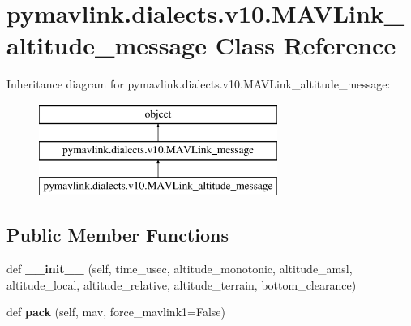 \hypertarget{classpymavlink_1_1dialects_1_1v10_1_1MAVLink__altitude__message}{}\section{pymavlink.\+dialects.\+v10.\+M\+A\+V\+Link\+\_\+altitude\+\_\+message Class Reference}
\label{classpymavlink_1_1dialects_1_1v10_1_1MAVLink__altitude__message}
Inheritance diagram for pymavlink.\+dialects.\+v10.\+M\+A\+V\+Link\+\_\+altitude\+\_\+message\+:\begin{figure}[H]
\begin{center}
\leavevmode
\includegraphics[height=3.000000cm]{classpymavlink_1_1dialects_1_1v10_1_1MAVLink__altitude__message}
\end{center}
\end{figure}
\subsection*{Public Member Functions}
\begin{DoxyCompactItemize}
\item 
\mbox{\label{classpymavlink_1_1dialects_1_1v10_1_1MAVLink__altitude__message_ad6216ccac072b9a6d583aad348bc483d}} 
def {\bfseries \+\_\+\+\_\+init\+\_\+\+\_\+} (self, time\+\_\+usec, altitude\+\_\+monotonic, altitude\+\_\+amsl, altitude\+\_\+local, altitude\+\_\+relative, altitude\+\_\+terrain, bottom\+\_\+clearance)
\item 
\mbox{\label{classpymavlink_1_1dialects_1_1v10_1_1MAVLink__altitude__message_a7124eb3991b678d11b4349086afe8b1e}} 
def {\bfseries pack} (self, mav, force\+\_\+mavlink1=False)
\end{DoxyCompactItemize}

